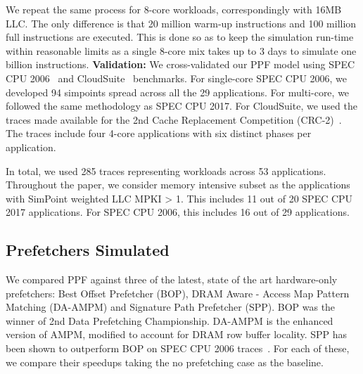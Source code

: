 We repeat the same process for 8-core workloads, correspondingly with
16MB LLC. The only difference is that 20 million warm-up instructions
and 100 million full instructions are executed. This is done so as to
keep the simulation run-time within reasonable limits as a single
8-core mix takes up to 3 days to simulate one billion instructions.
\newline
\newline
\noindent \textbf{Validation:} We cross-validated our PPF model using
SPEC CPU 2006~\cite{SPEC2006} and CloudSuite~\cite{CloudSuite}
benchmarks. For single-core SPEC CPU 2006, we developed 94 simpoints
spread across all the 29 applications.  For multi-core, we followed
the same methodology as SPEC CPU 2017.  For CloudSuite, we used the
traces made available for the 2nd Cache Replacement Competition
(CRC-2)~\cite{CRC_2}. The traces include four 4-core applications with
six distinct phases per application.

In total, we used 285 traces representing workloads across 53
applications.  Throughout the paper, we consider memory intensive
subset as the applications with SimPoint weighted LLC MPKI > 1. This
includes 11 out of 20 SPEC CPU 2017 applications. For SPEC CPU 2006,
this includes 16 out of 29 applications.

\subsection{Prefetchers Simulated}
\label{Method-Prefetchers}
We compared PPF against three of the latest, state of the art
hardware-only prefetchers: Best Offset Prefetcher (BOP), DRAM Aware -
Access Map Pattern Matching (DA-AMPM) \cite{DA_AMPM} and Signature
Path Prefetcher (SPP).  BOP was the winner of 2nd Data Prefetching
Championship. DA-AMPM is the enhanced version of AMPM, modified to
account for DRAM row buffer locality. SPP has been shown to outperform
BOP on SPEC CPU 2006 traces~\cite{SPP}. For each of these, we compare
their speedups taking the no prefetching case as the baseline.

